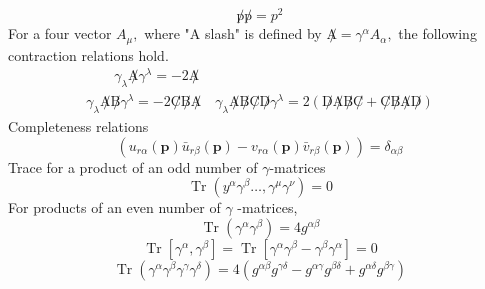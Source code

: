\begin{equation}
\not p \not p=p^{2}
\end{equation}
For a four vector $A_{\mu},$ where "A slash" is defined by $\not A=\gamma^{\alpha} A_{\alpha},$ the following contraction relations hold.
\begin{equation}
\begin{array}{l}
{\qquad \gamma_{\lambda} \not A \gamma^{\lambda}=-2 \not A} \\
{\gamma_{\lambda} \not A \not B \gamma^{\lambda}=-2 \not C \not B\not A \quad \gamma_{\lambda} \not A\not B\not C\not D\gamma^{\lambda}=2(\not D \not A\not B\not C+\not C \not B \not A \not D)}
\end{array}
\end{equation}
Completeness relations
\begin{equation}
\left(u_{r \alpha}(\mathbf{p}) \bar{u}_{r \beta}(\mathbf{p})-v_{r \alpha}(\mathbf{p}) \bar{v}_{r \beta}(\mathbf{p})\right)=\delta_{\alpha \beta}
\end{equation}
Trace for a product of an odd number of $\gamma$-matrices
\begin{equation}
\operatorname{Tr}\left(y^{\alpha} \gamma^{\beta} \dots, \gamma^{\mu} \gamma^{\nu}\right)=0
\end{equation}
For products of an even number of $\gamma$ -matrices,
$$
\operatorname{Tr}\left(\gamma^{\alpha} \gamma^{\beta}\right)=4 g^{\alpha \beta}
$$
$$
\operatorname{Tr}\left[\gamma^{\alpha}, \gamma^{\beta}\right]=\operatorname{Tr}\left[\gamma^{\alpha} \gamma^{\beta}-\gamma^{\beta} \gamma^{\alpha}\right]=0
$$
$$
\operatorname{Tr}\left(\gamma^{\alpha} \gamma^{\beta} \gamma^{\gamma} \gamma^{\delta}\right)=4\left(g^{\alpha \beta} g^{\gamma \delta}-g^{\alpha \gamma} g^{\beta \delta}+g^{\alpha \delta} g^{\beta \gamma}\right)
$$